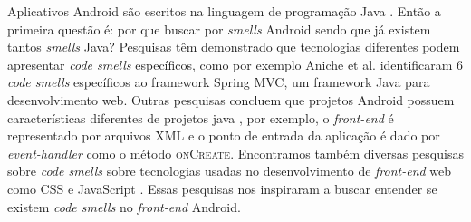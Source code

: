 Aplicativos Android s\~ao escritos na linguagem de programa\c{c}\~ao Java \cite{AndroidFundamentals}. Ent\~ao a primeira quest\~ao \'e: por que buscar por \textit{smells} Android sendo que j\'a existem tantos \textit{smells} Java? Pesquisas t\^em demonstrado que tecnologias diferentes podem apresentar \textit{code smells} espec\'ificos, como por exemplo Aniche et al. identificaram 6 \textit{code smells} espec\'ificos ao framework Spring MVC, um framework Java para desenvolvimento web. Outras pesquisas concluem que projetos Android possuem caracter\'isticas diferentes de projetos java \cite{Hecht2015, Mannan_Dig_Ahmed_Jensen_Abdullah_Almurshed, ReimannBrylski2013}, por exemplo, o \textit{front-end} \'e representado por arquivos XML e o ponto de entrada da aplica\c{c}\~ao \'e dado por \textit{event-handler} \cite{AndroidActivities2016} como o m\'etodo \textsc{onCreate}. Encontramos tamb\'em diversas pesquisas sobre \textit{code smells} sobre tecnologias usadas no desenvolvimento de \textit{front-end} web como CSS \cite{CSSCodeSmell} e JavaScript \cite{BB}. Essas pesquisas nos inspiraram a buscar entender se existem \textit{code smells} no \textit{front-end} Android. \\


